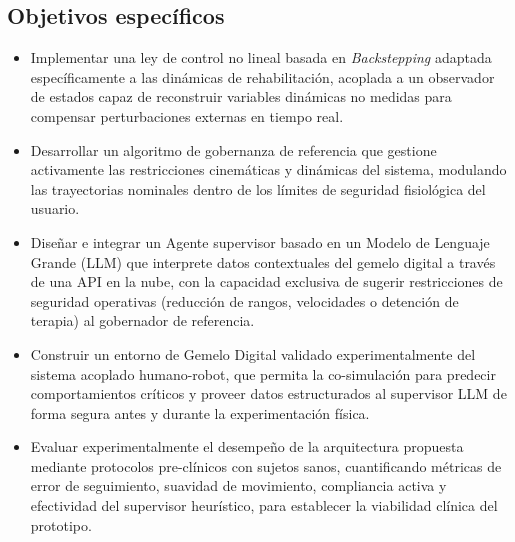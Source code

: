 \documentclass[a4paper,12pt]{article}
\begin{document}
\subsection{Objetivos específicos}

\begin{itemize}

    \item Implementar una ley de control no lineal basada en \textit{Backstepping} adaptada específicamente a las dinámicas de rehabilitación, acoplada a un observador de estados capaz de reconstruir variables dinámicas no medidas para compensar perturbaciones externas en tiempo real.

    \item Desarrollar un algoritmo de gobernanza de referencia que gestione activamente las restricciones cinemáticas y dinámicas del sistema, modulando las trayectorias nominales dentro de los límites de seguridad fisiológica del usuario.

    \item Diseñar e integrar un Agente supervisor basado en un Modelo de Lenguaje Grande (LLM) que interprete datos contextuales del gemelo digital a través de una API en la nube, con la capacidad exclusiva de sugerir restricciones de seguridad operativas (reducción de rangos, velocidades o detención de terapia) al gobernador de referencia.

    \item Construir un entorno de Gemelo Digital validado experimentalmente del sistema acoplado humano-robot, que permita la co-simulación para predecir comportamientos críticos y proveer datos estructurados al supervisor LLM de forma segura antes y durante la experimentación física.

    \item Evaluar experimentalmente el desempeño de la arquitectura propuesta mediante protocolos pre-clínicos con sujetos sanos, cuantificando métricas de error de seguimiento, suavidad de movimiento, compliancia activa y efectividad del supervisor heurístico, para establecer la viabilidad clínica del prototipo.

\end{itemize}


\newpage
\end{document}
